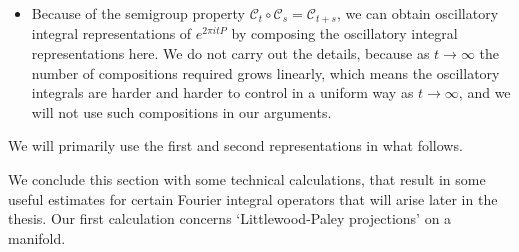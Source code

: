 \begin{itemize}
  \item Because of the semigroup property $\mathcal{C}_t \circ \mathcal{C}_s = \mathcal{C}_{t+s}$, we can obtain oscillatory integral representations of $e^{2 \pi i t P}$ by composing the oscillatory integral representations here. We do not carry out the details, because as $t \to \infty$ the number of compositions required grows linearly, which means the oscillatory integrals are harder and harder to control in a uniform way as $t \to \infty$, and we will not use such compositions in our arguments.
\end{itemize}
%
We will primarily use the first and second representations in what follows.

We conclude this section with some technical calculations, that result in some useful estimates for certain Fourier integral operators that will arise later in the thesis. Our first calculation concerns `Littlewood-Paley projections' on a manifold.

